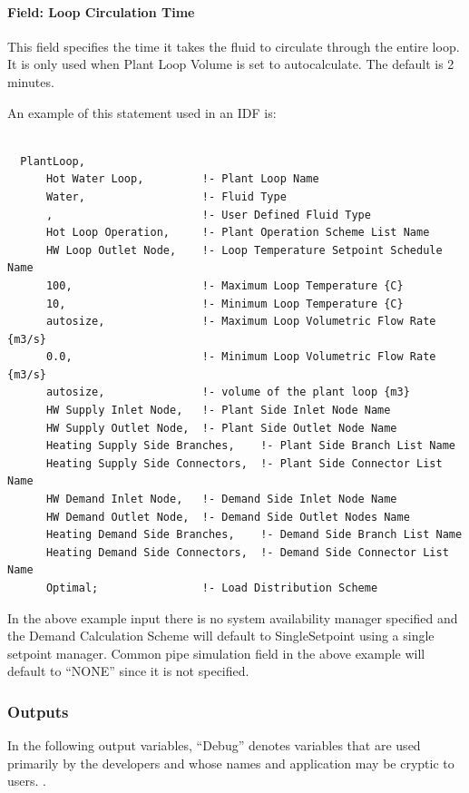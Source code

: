 \paragraph{Field: Loop Circulation Time}\label{field-pressure-simulation-type}

This field specifies the time it takes the fluid to circulate through the entire loop. It is only used when Plant Loop Volume is set to autocalculate. The default is 2 minutes.

An example of this statement used in an IDF is:

\begin{lstlisting}

  PlantLoop,
      Hot Water Loop,         !- Plant Loop Name
      Water,                  !- Fluid Type
      ,                       !- User Defined Fluid Type
      Hot Loop Operation,     !- Plant Operation Scheme List Name
      HW Loop Outlet Node,    !- Loop Temperature Setpoint Schedule Name
      100,                    !- Maximum Loop Temperature {C}
      10,                     !- Minimum Loop Temperature {C}
      autosize,               !- Maximum Loop Volumetric Flow Rate {m3/s}
      0.0,                    !- Minimum Loop Volumetric Flow Rate {m3/s}
      autosize,               !- volume of the plant loop {m3}
      HW Supply Inlet Node,   !- Plant Side Inlet Node Name
      HW Supply Outlet Node,  !- Plant Side Outlet Node Name
      Heating Supply Side Branches,    !- Plant Side Branch List Name
      Heating Supply Side Connectors,  !- Plant Side Connector List Name
      HW Demand Inlet Node,   !- Demand Side Inlet Node Name
      HW Demand Outlet Node,  !- Demand Side Outlet Nodes Name
      Heating Demand Side Branches,    !- Demand Side Branch List Name
      Heating Demand Side Connectors,  !- Demand Side Connector List Name
      Optimal;                !- Load Distribution Scheme
\end{lstlisting}

In the above example input there is no system availability manager specified and the Demand Calculation Scheme will default to SingleSetpoint using a single setpoint manager. Common pipe simulation field in the above example will default to ``NONE'' since it is not specified.

\subsubsection{Outputs}\label{outputs-024}

In the following output variables, ``Debug'' denotes variables that are used primarily by the developers and whose names and application may be cryptic to users. .

